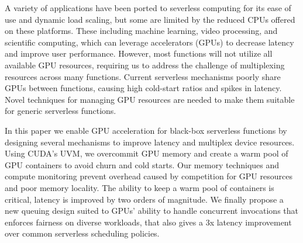 A variety of applications have been ported to severless computing for its ease of use and dynamic load scaling, but some are limited by the reduced CPUs offered on these platforms.
These including machine learning, video processing, and scientific computing, which can leverage accelerators (GPUs) to decrease latency and improve user performance.
However, most functions will not utilize all available GPU resources, requiring us to address the challenge of multiplexing resources across many functions.
Current serverless mechanisms poorly share GPUs between functions, causing high cold-start ratios and spikes in latency.
Novel techniques for managing GPU resources are needed to make them suitable for generic serverless functions.

In this paper we enable GPU acceleration for black-box serverless functions by designing several mechanisms to improve latency and multiplex device resources.
Using CUDA's UVM, we overcommit GPU memory and create a warm pool of GPU containers to avoid churn and cold starts.
Our memory techniques and compute monitoring prevent overhead caused by competition for GPU resources and poor memory locality.
The ability to keep a warm pool of containers is critical, latency is improved by two orders of magnitude.
We finally propose a new queuing design suited to GPUs' ability to handle concurrent invocations that enforces fairness on diverse workloads, that also gives a 3x latency improvement over common serverless scheduling policies.
